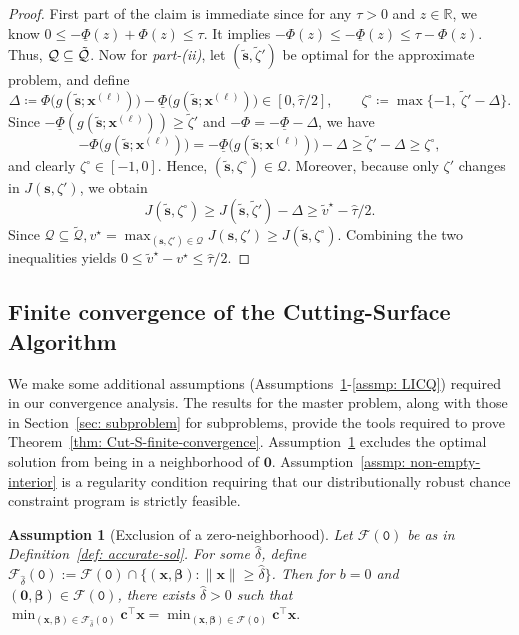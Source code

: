 \documentclass[opre,sglanonrev]{informs4}
\newtheorem{assumption}{Assumption}
\newcommand{\mF}{\mathcal{F}}
\newcommand{\mQ}{\mathcal Q}
\newcommand{\mbR}{\mathbb R}
\newcommand{\bbeta}{\bm{\beta}}
\newcommand{\bzero}{\bm{0}}
\newcommand{\bc}{\bm{c}}
\newcommand{\bs}{\bm{s}}
\newcommand{\bx}{\bm{x}}
\begin{document}
{\begin{proof}
   First part of the claim is immediate since for any $\tau > 0$ and $z \in \mbR$, we know $0 \leq -\underline{\Phi}(z) + \Phi(z) \leq \tau$.  It implies
    $- \Phi(z) \leq -\underline{\Phi}(z) \leq \tau - \Phi(z)$. Thus, $\mQ \subseteq \Tilde{\mQ}$. Now for \emph{part-(ii)}, let $(\tilde{\bs},\tilde{\zeta}')$ be optimal for the approximate problem, and define
\[
\Delta \coloneqq \Phi\!\big(g(\tilde{\bs};\bx^{(\ell)})\big)-\underline{\Phi}\!\big(g(\tilde{\bs};\bx^{(\ell)})\big)\in[0,\hat\tau/2],
\qquad
\zeta^\circ \coloneqq \max\{-1,\ \tilde{\zeta}'-\Delta\}.
\]
Since $-\underline{\Phi}(g(\tilde{\bs};\bx^{(\ell)}))\ge \tilde{\zeta}'$ and $-\Phi = -\underline{\Phi}-\Delta$, we have
\[
-\Phi\!\big(g(\tilde{\bs};\bx^{(\ell)})\big)
= -\underline{\Phi}\!\big(g(\tilde{\bs};\bx^{(\ell)})\big) - \Delta
\ge \tilde{\zeta}'-\Delta
\ge \zeta^\circ,
\]
and clearly $\zeta^\circ\in[-1,0]$. Hence, $(\tilde{\bs},\zeta^\circ)\in\mQ$. Moreover, because only $\zeta'$ changes in $J(\bs,\zeta')$, we obtain
\[
J(\tilde{\bs},\zeta^\circ) \ge J(\tilde{\bs},\tilde{\zeta}') - \Delta \ge \tilde v^\star - \hat\tau/2.
\]
Since $\mQ\subseteq \tilde{\mQ}, v^\star = \max_{(\bs,\zeta')\in\mQ} J(\bs,\zeta') \geq J(\tilde{\bs},\zeta^\circ)$. Combining the two inequalities yields $0 \leq \tilde v^\star - v^\star \le \hat\tau/2$.
\end{proof}

\subsection{Finite convergence of the Cutting-Surface Algorithm}
We make some additional assumptions (Assumptions~\ref{assmp: strict-strict-interior}-\ref{assmp: LICQ}) required in our convergence analysis. The results for the master problem, along with those in Section~\ref{sec: subproblem} for subproblems, provide the tools required to prove Theorem~\ref{thm: Cut-S-finite-convergence}. Assumption~\ref{assmp: strict-strict-interior} excludes the optimal solution from being in a neighborhood of $\bzero$. Assumption~\ref{assmp: non-empty-interior} is a regularity condition requiring that our distributionally robust chance constraint program is strictly feasible.  


\begin{assumption}[Exclusion of a zero-neighborhood]\label{assmp: strict-strict-interior} Let $\mF(\mathtt{0})$ be as in Definition~\ref{def: accurate-sol}. For some $\hat{\delta}$, define $\mF_{\hat{\delta}}(\mathtt{0})
:=
\mF(\mathtt{0})\cap
\{(\bx,\bbeta):\|\bx\|\ge\hat{\delta}\}$. Then for $b=0$ and $(\bzero, \bbeta) \in \mF(\mathtt{0})$,  there exists
$\hat{\delta}>0$ such that $\min_{(\bx,\bbeta)\in\mF_{\hat{\delta}}(\mathtt{0})}\bc^\top\bx
=
\min_{(\bx,\bbeta)\in\mF(\mathtt{0})}\bc^\top\bx.$
\end{assumption}

}
\end{document}

